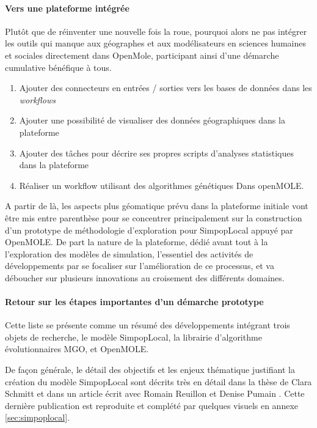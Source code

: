 \paragraph {Vers une plateforme intégrée}

Plutôt que de réinventer une nouvelle fois la roue, pourquoi alors ne pas intégrer les outils qui manque aux géographes et aux modélisateurs en sciences humaines et sociales directement dans OpenMole, participant ainsi d'une démarche cumulative bénéfique à tous.

\begin{enumerate}[label=(\alph*),labelindent=\parindent,leftmargin=*]
\item Ajouter des connecteurs en entrées / sorties vers les bases de données dans les \textit{workflows}
\item  Ajouter une possibilité de visualiser des données géographiques dans la plateforme
\item  Ajouter des tâches pour décrire ses propres scripts d'analyses statistiques dans la plateforme
\item  Réaliser un workflow utilisant des algorithmes génétiques Dans openMOLE.
\end{enumerate}

A partir de là, les aspects plus géomatique prévu dans la plateforme initiale vont être mis entre parenthèse pour se concentrer principalement sur la construction d'un prototype de méthodologie d'exploration pour SimpopLocal appuyé par OpenMOLE. De part la nature de la plateforme, dédié avant tout à la l'exploration des modèles de simulation, l'essentiel des activités de développements par se focaliser sur l'amélioration de ce processus, et va déboucher sur plusieurs innovations au croisement des différents domaines.

\paragraph {Retour sur les étapes importantes d'un démarche prototype}


Cette liste se présente comme un résumé des développements intégrant trois objets de recherche, le modèle SimpopLocal, la librairie d'algorithme évolutionnaires MGO, et OpenMOLE.

De façon générale, le détail des objectifs et les enjeux thématique justifiant la création du modèle SimpopLocal sont décrits très en détail dans la thèse de Clara Schmitt \autocite{Schmitt2014} et dans un article écrit avec Romain Reuillon et Denise Pumain \autocite{Schmitt2015}. Cette dernière publication est reproduite et complété par quelques visuels en annexe \ref{sec:simpoplocal}. 

